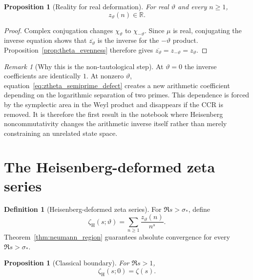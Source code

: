 \documentclass[11pt]{amsart}
\numberwithin{equation}{section}
\theoremstyle{plain}
\newtheorem{proposition}[theorem]{Proposition}
\theoremstyle{definition}
\newtheorem{definition}[theorem]{Definition}
\theoremstyle{remark}
\newtheorem{remark}[theorem]{Remark}
\begin{document}
\begin{proposition}[Reality for real deformation]
\label{prop:ztheta_real}
For real \(\vartheta\) and every \(n\ge1\),
\begin{equation}
z_\vartheta(n)\in\mathbb R.
\label{eq:ztheta_real}
\end{equation}
\end{proposition}

\begin{proof}
Complex conjugation changes \(\chi_\vartheta\) to
\(\chi_{-\vartheta}\).  Since \(\mu\) is real, conjugating the inverse
equation shows that \(\overline{z_\vartheta}\) is the inverse for the
\(-\vartheta\) product.  Proposition~\ref{prop:theta_evenness} therefore
gives \(\overline{z_\vartheta}=z_{-\vartheta}=z_\vartheta\).
\end{proof}

\begin{remark}[Why this is the non-tautological step]
\label{rem:non_tautological_step}
At $\vartheta=0$ the inverse coefficients are identically $1$.  At nonzero
$\vartheta$, equation~\eqref{eq:ztheta_semiprime_defect} creates a new
arithmetic coefficient depending on the logarithmic separation of two
primes.  This dependence is forced by the symplectic area in the Weyl
product and disappears if the CCR is removed.  It is therefore the first
result in the notebook where Heisenberg noncommutativity changes the
arithmetic inverse itself rather than merely constraining an unrelated
state space.
\end{remark}

\section{The Heisenberg-deformed zeta series}
\label{sec:deformed_zeta_series}

\begin{definition}[Heisenberg-deformed zeta series]
\label{def:deformed_zeta_series}
For $\Re s>\sigma_*$, define
\begin{equation}
\zeta_{\mathrm H}(s;\vartheta)
=
\sum_{n\ge1}\frac{z_{\vartheta}(n)}{n^s}.
\label{eq:deformed_zeta_series}
\end{equation}
Theorem~\ref{thm:neumann_region} guarantees absolute convergence for every $\Re s>\sigma_*$.
\end{definition}

\begin{proposition}[Classical boundary]
\label{prop:zeta_classical_boundary}
For $\Re s>1$,
\begin{equation}
\zeta_{\mathrm H}(s;0)=\zeta(s).
\label{eq:zeta_classical_boundary}
\end{equation}
\end{proposition}
\end{document}
